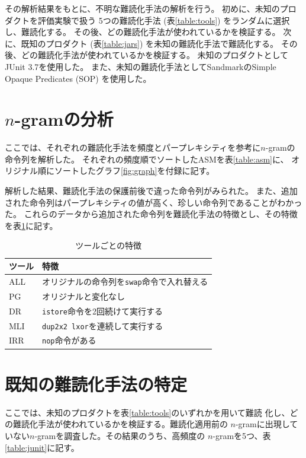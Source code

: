 \documentclass[12pt,twoside]{jreport}
\begin{document}
その解析結果をもとに、不明な難読化手法の解析を行う。
初めに、未知のプロダクトを評価実験で扱う
5つの難読化手法 (表\ref{table:tools}) をランダムに選択し、難読化する。
その後、どの難読化手法が使われているかを検証する。
次に、既知のプロダクト (表\ref{table:jars}) を未知の難読化手法で難読化する。
その後、どの難読化手法が使われているかを検証する。
未知のプロダクトとしてJUnit 3.7を使用した。
また、未知の難読化手法としてSandmarkのSimple Opaque Predicates (SOP) を使用した。

\section{$n$-gramの分析}

ここでは、それぞれの難読化手法を頻度とパープレキシティを参考に$n$-gramの命令列を解析した。
それぞれの頻度順でソートしたASMを表\ref{table:asm}に、
オリジナル順にソートしたグラフ\ref{fig:graph}を付録に記す。

解析した結果、難読化手法の保護前後で違った命令列がみられた。
また、追加された命令列はパープレキシティの値が高く、珍しい命令列であることがわかった。
これらのデータから追加された命令列を難読化手法の特徴とし、その特徴を表\ref{table:features}に記す。

\begin{table}[t]
  \centering
  \footnotesize{
    \caption{ツールごとの特徴}\label{table:features}
  \begin{tabular}{l|l}
    ツール              & 特徴　\\ \hline
    ALL & オリジナルの命令列を\texttt{swap}命令で入れ替える \\
    PG  & オリジナルと変化なし \\
    DR  & \texttt{istore}命令を2回続けて実行する \\
    MLI & \texttt{dup2x2 lxor}を連続して実行する \\
    IRR & \texttt{nop}命令がある \\
  \end{tabular}}
\end{table}

\section{既知の難読化手法の特定}

ここでは、未知のプロダクトを表\ref{table:tools}のいずれかを用いて難読
化し、どの難読化手法が使われているかを検証する。難読化適用前の
$n$-gramに出現していない$n$-gramを調査した。その結果のうち、高頻度の
$n$-gramを5つ、表\ref{table:junit}に記す。
\end{document}
